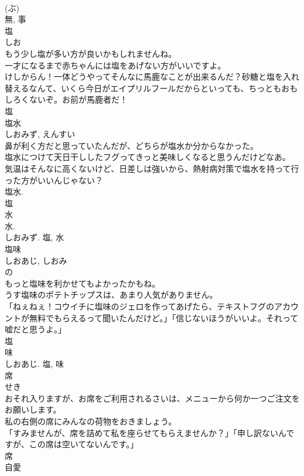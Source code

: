\documentclass[8pt]{extreport}
\begin{document}
\begin{CJK}{UTF8}{min}
\\	(ぶ) 
\\	無, 事	
\\	塩	
\\	しお	
\\	もう少し塩が多い方が良いかもしれませんね。	
\\	一才になるまで赤ちゃんには塩をあげない方がいいですよ。	
\\	けしからん！一体どうやってそんなに馬鹿なことが出来るんだ？砂糖と塩を入れ替えるなんて、いくら今日がエイプリルフールだからといっても、ちっともおもしろくないぞ。お前が馬鹿者だ！	
\\	塩	
\\	塩水	
\\	しおみず, えんすい	
\\	鼻が利く方だと思っていたんだが、どちらが塩水か分からなかった。	
\\	塩水につけて天日干ししたフグってきっと美味しくなると思うんだけどなあ。	
\\	気温はそんなに高くないけど、日差しは強いから、熱射病対策で塩水を持って行った方がいいんじゃない？	
\\	塩水.	
\\	塩
\\	水
\\	水. 
\\	しおみず.	塩, 水	
\\	塩味	
\\	しおあじ, しおみ	
\\	の 
\\	もっと塩味を利かせてもよかったかもね。	
\\	うす塩味のポテトチップスは、あまり人気がありません。	
\\	「ねぇねぇ！コウイチに塩味のジェロを作ってあげたら、テキストフグのアカウントが無料でもらえるって聞いたんだけど。」「信じないほうがいいよ。それって嘘だと思うよ。」	
\\	塩 
\\	味 
\\	しおあじ.	塩, 味	
\\	席	
\\	せき	
\\	おそれ入りますが、お席をご利用されるさいは、メニューから何か一つご注文をお願いします。	
\\	私の右側の席にみんなの荷物をおきましょう。	
\\	「すみませんが、席を詰めて私を座らせてもらえませんか？」「申し訳ないんですが、この席は空いてないんです。」	
\\	席	
\\	自愛	

\end{CJK}
\end{document}
